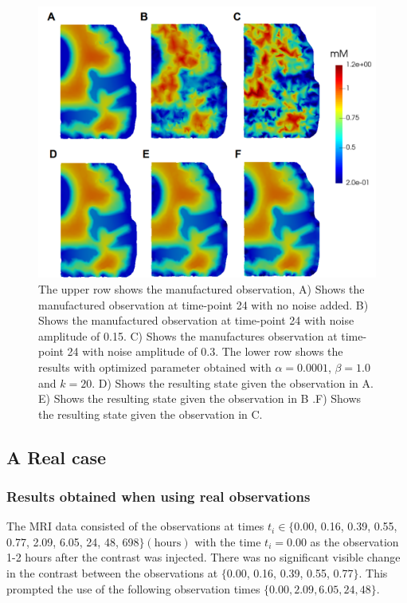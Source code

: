 \documentclass[12pt,a4paper]{article}
\begin{document}
\begin{figure}
\centering
\includegraphics[scale=0.4]{noise-24.png}
\caption{The upper row shows the manufactured observation, A) Shows the manufactured observation at time-point 24 with no noise added. B) Shows the manufactured observation at time-point 24 with noise amplitude of 0.15. C) Shows the manufactures observation at time-point 24 with noise amplitude of 0.3. The lower row shows the results with optimized parameter obtained with $\alpha=0.0001$, $\beta=1.0$ and $k=20$. D) Shows the resulting state given the observation in A. E)  Shows the resulting state given the observation in B .F) Shows the resulting state given the observation in C.  }
\label{24hourswithnoise}
\end{figure}

\subsection{A Real case} 

\subsubsection{Results obtained when using real observations}
The MRI data consisted of the observations at times $t_i \in \lbrace$0.00, 0.16, 0.39, 0.55, 0.77, 2.09, 6.05, 24, 48, 698$\rbrace \mathrm{(hours)}$ with the time $t_i=0.00$ as the observation 1-2 hours after the contrast was injected. There was no significant visible change in the contrast between the observations at $\lbrace$0.00, 0.16, 0.39, 0.55, 0.77$\rbrace$. This prompted the use of the following observation times  $\lbrace0.00, 2.09, 6.05, 24, 48\rbrace$. 
\end{document}
